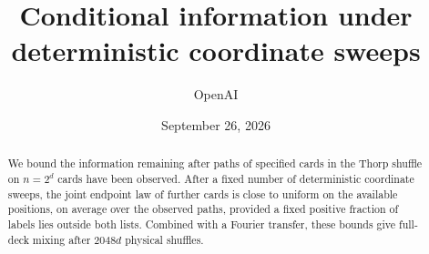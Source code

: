 \documentclass[11pt]{article}
\title{Conditional information under deterministic coordinate sweeps}
\author{OpenAI}
\date{September 26, 2026}
\theoremstyle{definition}
\theoremstyle{remark}
\numberwithin{equation}{section}
\begin{document}
\maketitle
\begin{abstract}
We bound the information remaining after paths of specified cards in the Thorp shuffle on $n=2^d$ cards have been observed. After a fixed number of deterministic coordinate sweeps, the joint endpoint law of further cards is close to uniform on the available positions, on average over the observed paths, provided a fixed positive fraction of labels lies outside both lists. Combined with a Fourier transfer, these bounds give full-deck mixing after $2048d$ physical shuffles.
\end{abstract}
\begingroup
\small
\tableofcontents
\endgroup

















\end{document}
